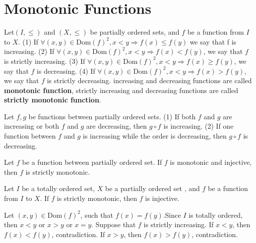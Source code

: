 \documentclass{book}
\numberwithin{equation}{section}
\begin{document}
\section{Monotonic Functions}
\begin{definitionenv}
    Let$(I, \le)$ and $(X, \le)$ be partially ordered sets, and $f$ be a function from $I$
 to $X$.
 \newline
 (1) If $\forall(x, y)\in \mathrm{Dom}(f)^2, x<y \Rightarrow f(x)\le f(y)$ we say that f is increasing.
 \newline
 (2) If $\forall (x, y)\in \mathrm{Dom}(f)^2, x<y \Rightarrow f(x)< f(y)$,  we say that $f$ is strictly increasing.
 \newline
  (3) If $\forall (x, y)\in \mathrm{Dom}(f)^2, x<y \Rightarrow f(x)\geq  f(y)$,  we say that $f$ is decreasing.
\newline
 (4) If $\forall (x, y)\in \mathrm{Dom}(f)^2, x<y \Rightarrow f(x)> f(y)$,  we say that $f$ is strictly decreasing.
 \newline
increasing and decreasing functions are called \textbf{monotonic function},  strictly increasing and decreasing functions are called \textbf{strictly monotonic function}.
\end{definitionenv}
\begin{propositionenv}
    Let $f, g$ be functions between partially ordered sets.
    \newline
    (1) If both $f$ and $g$ are increasing or both $f$ and $g$ are decreasing, then $g\circ f $ is increasing.
    \newline
    (2) If one function between $f$ and $g$ is increasing while the order is decreasing, then $g\circ f $ is decreasing.
\end{propositionenv}
\begin{propositionenv}
    Let $f$ be a function between partially ordered set. If $f$ is monotonic and injective,  then $f$ is strictly monotonic.
\end{propositionenv}
\begin{propositionenv}
    Let $I$ be a totally ordered set, $X$ be a partially ordered set , and $f$ be a function from $I$ to $X$. If $f$ is strictly monotonic,  then $f$ is injective.
\end{propositionenv}
\begin{proofenv}
    Let $(x, y)\in \mathrm{Dom}(f)^2$, such that $f(x)=f(y)$.Since $I$ is totally ordered,  then $x<y$ or $x>y$ or $x=y$. Suppose that $f$ is strictly increasing. If $x<y $, then $f(x)<f(y)$,  contradiction. If $x>y $, then $f(x)>f(y)$,  contradiction.
\end{proofenv}
\end{document}
